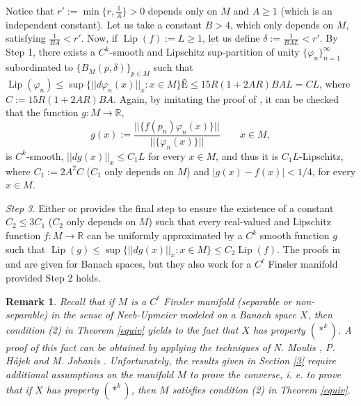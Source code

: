 \documentclass[11pt]{amsart}
\newtheorem{rem}[thm]{Remark}
\numberwithin{equation}{section}
\begin{document}
 Notice that $r':=\min\{r, \frac{1}{A}\}>0$ depends only on $M$ and $A\ge 1$ (which is an independent constant). Let us take a constant
$B > 4$, which only depends on $M$, satisfying $\frac{1}{BA}<r'$. Now, if ${\operatorname{Lip}}(f):=L\ge 1$, let us define
$\delta:=\frac{1}{BAL}< r'$. By Step 1, there exists a $C^k$-smooth and Lipschitz sup-partition of unity
$\{\varphi_n\}_{n=1}^\infty$ subordinated to $\{B_M(p,\delta)\}_{p\in M}$ such that ${\operatorname{Lip}}(\varphi_n)\le \sup\{||d\varphi_n(x)||_x:x\in M\}Ê\le 15R(1+2AR) BAL=CL$, where $C:=15R(1+2AR)BA$.  Again, by imitating the proof
of \cite{Fry1, azafrymon} , it can be checked that the function $g:M\rightarrow \mathbb R$,
\begin{equation*}
g(x):=\frac{||\{f(p_n)\varphi_n(x)\}||}{||\{\varphi_n(x)\}||} \qquad x\in M,
\end{equation*}
is $C^k$-smooth, $||dg(x)||_x\le C_1L$ for every $x\in M$, and thus it is $C_1L$-Lipschitz,  where $C_1:=2A^2C$ ($C_1$ only depends on  $M$) and   $|g(x)-f(x)|<1/4$, for every $x\in M$.

\medskip

 {\em Step 3.} Either   \cite[Proposition 1 and Theorem 3]{HajekJohanis} or \cite[Lemma 1]{Azafrykeener}
 provides the final step to ensure the existence of a constant $C_2\le 3C_1$ ($C_2$ only depends on $M$) such that every  real-valued and Lipschitz function
 $f:M\rightarrow \mathbb R$ can be uniformly approximated by a  $C^k$ smooth function $g$ such that ${\operatorname{Lip}}(g)\le \sup\{||dg(x)||_x:x\in M\}\le C_2{\operatorname{Lip}}(f)$.
 The proofs in \cite{HajekJohanis} and  \cite{Azafrykeener} are given
 for Banach spaces, but they also work for a $C^\ell$ Finsler manifold provided  Step 2 holds.

 
 

\medskip

\begin{rem}
Recall that if $M$ is a $C^{\ell}$ Finsler manifold (separable or non-separable) in the sense of Neeb-Upmeier modeled on a Banach space $X$, then condition (2) in Theorem \ref{equiv} yields to the fact that $X$ has property $(*^k)$. A proof of this fact can be obtained by applying the techniques of N. Moulis \cite{Moulis}, P. H\'ajek and M. Johanis \cite{HajekJohanis}.
Unfortunately, the results given in Section \ref{3} require additional assumptions  on the manifold $M$ to prove the converse, i. e. to prove that if  $X$ has property $(*^k)$, then $M$ satisfies condition (2) in Theorem \ref{equiv}.
\end{rem}
\end{document}
